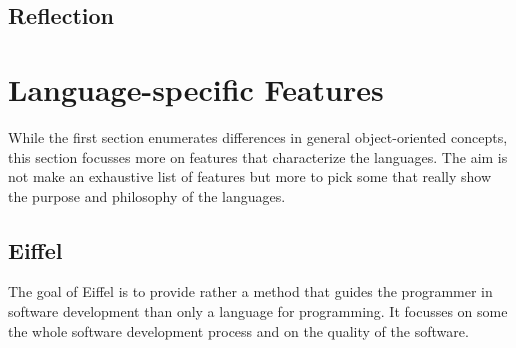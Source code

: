 \documentclass[12pt,a4paper,twocolumn]{article}
\begin{document}
\subsection{Reflection}

\section{Language-specific Features}
While the first section enumerates differences in general object-oriented concepts, this section focusses more on features that characterize the languages. The aim is not make an exhaustive list of features but more to pick some that really show the purpose and philosophy of the languages.
\subsection{Eiffel}
The goal of Eiffel is to provide rather a method that guides the programmer in software development than only a language for programming. It focusses on some the whole software development process and on the quality of the software. 
\end{document}
